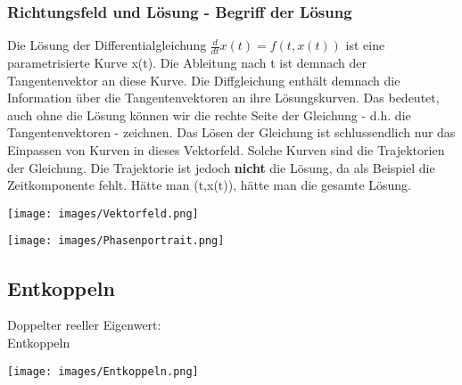 \subsubsection{Richtungsfeld und Lösung - Begriff der Lösung}
Die Lösung der Differentialgleichung $\frac{d}{dt}x(t) = f(t,x(t))$ ist eine parametrisierte Kurve x(t). Die Ableitung nach t ist demnach der Tangentenvektor an diese Kurve. Die Diffgleichung enthält demnach die Information über die Tangentenvektoren an ihre Lösungskurven. 
Das bedeutet, auch ohne die Lösung können wir die rechte Seite der Gleichung - d.h. die Tangentenvektoren - zeichnen. Das Lösen der Gleichung ist schlussendlich nur das Einpassen von Kurven in dieses Vektorfeld. Solche Kurven sind die Trajektorien der Gleichung. Die Trajektorie ist jedoch \textbf{nicht} die Lösung, da als Beispiel die Zeitkomponente fehlt. Hätte man (t,x(t)), hätte man die gesamte Lösung. 
\begin{minipage}[h]{0.35\textwidth} 
	\texttt{[image: images/Vektorfeld.png]}
\end{minipage}
\begin{minipage}[h]{0.35\textwidth}
	\texttt{[image: images/Phasenportrait.png]}
\end{minipage}



\subsection{Entkoppeln}
\begin{minipage}[h]{0.35\textwidth}
Doppelter reeller Eigenwert:\\ Entkoppeln
\end{minipage}
\begin{minipage}[h]{0.5\textwidth}
	\texttt{[image: images/Entkoppeln.png]}
\end{minipage}

